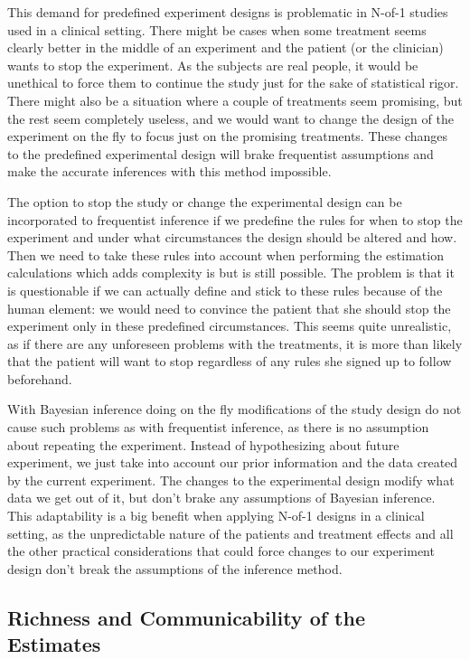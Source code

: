 \documentclass[12pt,a4paper,leqno]{report}
\theoremstyle{plain}
\theoremstyle{definition}
\theoremstyle{remark}
\begin{document}
This demand for predefined experiment designs is problematic in N-of-1 studies
used in a clinical setting. There might be cases when some treatment seems
clearly better in the middle of an experiment and the patient (or the clinician)
wants to stop the experiment. As the subjects are real people, it would be
unethical to force them to continue the study just for the sake of statistical
rigor. There might also be a situation where a couple of treatments seem
promising, but the rest seem completely useless, and we would want to change the
design of the experiment on the fly to focus just on the promising treatments.
These changes to the predefined experimental design will brake frequentist
assumptions and make the accurate inferences with this method impossible.

The option to stop the study or change the experimental design can be
incorporated to frequentist inference if we predefine the rules for when to
stop the experiment and under what circumstances the design should be altered
and how. Then we need to take these rules into account when performing the estimation
calculations which adds complexity is but is still possible. The problem is that it is
questionable if we can actually define and stick to these rules because of
the human element: we would need to convince the patient that she should
stop the experiment only in these predefined circumstances. This seems quite
unrealistic, as if there are any unforeseen problems with the treatments, it is
more than likely that the patient will want to stop regardless of any rules she
signed up to follow beforehand.

With Bayesian inference doing on the fly modifications of the study design do not
cause such problems as with frequentist inference, as there is no assumption
about repeating the experiment. Instead of hypothesizing about future
experiment, we just take into account our prior information and the data created by
the current experiment. The changes to the experimental design modify what data
we get out of it, but don't brake any assumptions of Bayesian inference. This
adaptability is a big benefit when applying N-of-1 designs in a clinical setting, as
the unpredictable nature of the patients and treatment effects and all the other
practical considerations that could force changes to our experiment design don't
break the assumptions of the inference method.

\subsection{Richness and Communicability of the Estimates}\label{whybayes}
\end{document}
